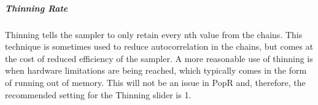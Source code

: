 \documentclass[
]{book}
\begin{document}
\hypertarget{gl-thin}{%
\subparagraph*{Thinning Rate}\label{gl-thin}}

Thinning tells the sampler to only retain every nth value from the chains. This technique is sometimes used to reduce autocorrelation in the chains, but comes at the cost of reduced efficiency of the sampler. A more reasonable use of thinning is when hardware limitations are being reached, which typically comes in the form of running out of memory. This will not be an issue in PopR and, therefore, the recommended setting for the Thinning slider is 1.
\end{document}

